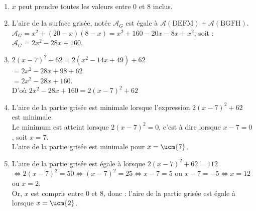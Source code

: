 \begin{corrige}
\ \\ [-5mm]
   \begin{enumerate}
      \item $x$ peut prendre toutes les valeurs {\blue entre 0 et 8 inclus}.
      \item L'aire de la surface grisée, notée $\mathcal{A}_G$ est égale à $\mathcal{A}(\text{DEFM})+\mathcal{A}(\text{BGFH})$. \\
         $\mathcal{A}_G =x^2+(20-x)(8-x) = x^2+160-20x-8x+x^2$, soit : \\
         {\blue $\mathcal{A}_G =2x^2 - 28x +160$}.
      \item $2(x - 7)^2 + 62 =2(x^2-14x+49)+62$ \\
         \hspace*{2.45cm} $=2x^2-28x+98+62$ \\
         \hspace*{2.45cm} $=2x^2-28x+160$. \\
         D'où {\blue $2x^2-28x+160 =2(x-7)^2+62$}
      \item L'aire de la partie grisée est minimale lorsque l'expression $2(x-7)^2+62$ est minimale. \\
         Le minimum est atteint lorsque $2(x-7)^2 =0$, c'est à dire lorsque $x-7 =0$, soit $x =7$. \\
         {\blue L'aire de la partie grisée est minimale pour $x =\ucm{7}$.}
      \item L'aire de la partie grisée est égale à  lorsque $2(x-7)^2+62 =112$ \\
         $\iff 2(x-7)^2 =50 \iff (x-7)^2=25 \iff x-7=5$ ou $x-7=-5 \iff x=12$ ou $x=2$. \\ 
         Or, $x$ est compris entre 0 et 8, donc : {\blue l'aire de la partie grisée est égale à  lorsque $x=\ucm{2}$.}
\end{enumerate}
\end{corrige}


\bigskip


